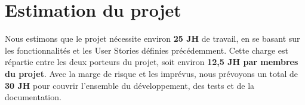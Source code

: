 \section{Estimation du projet}

Nous estimons que le projet nécessite environ \textbf{25 JH} de travail, en se basant sur les fonctionnalités et les User Stories définies précédemment.
Cette charge est répartie entre les deux porteurs du projet, soit environ \textbf{12,5 JH par membres du projet}.
Avec la marge de risque et les imprévus, nous prévoyons un total de \textbf{30 JH} pour couvrir l'ensemble du développement, des tests et de la documentation.

